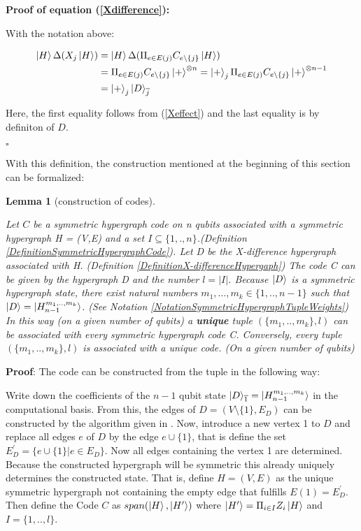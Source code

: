 \documentclass[12pt]{iopart}
\newtheorem{lemma}{Lemma}
\begin{document}
\textbf{Proof of equation (\ref{Xdifference}):}

With the notation above:

\begin{eqnarray}
\ket{H} \Delta (X_j\ket{H}) &= \ket{H} \Delta (\Pi_{e \in E(j)} C_{e \setminus \{j\}} \ket{H}) \nonumber \\ &=\Pi_{e \in E(j)} C_{e \setminus \{j\}} \ket{+}^{\otimes n} = \ket{+}_j \Pi_{e \in E(j)} C_{e\setminus \{j\}} \ket{+}^{\otimes n-1} \nonumber \\ &= \ket{+}_j\ket{D}_{\overline{j}}
\end{eqnarray}

Here, the first equality follows from (\ref{Xeffect}) and the last equality is by definiton of $D$.

\begin{flushright}
$\square$
\end{flushright}

With this definition, the construction mentioned at the beginning of this section can be formalized:

\begin{lemma}[construction of codes]
\label{tupleCorrespondence}

Let $C$ be a symmetric hypergraph code on n qubits associated with a symmetric hypergraph H = (V,E) and a set $I \subseteq \{1,.,n\}$.(Definition \ref{DefinitionSymmetricHypergraphCode}).
Let D be the X-difference hypergraph associated with H. (Definition \ref{DefinitionX-differenceHypergaph})
The code C can be given by the hypergraph D and the number $l = |I|$.
Because $\ket{D}$ is a symmetric hypergraph state, there exist natural numbers
$m_1,...,m_k \in \{1,..,n-1\}$ such that $\ket{D} =\ket{H^{m_1,..,m_k}_{n-1}}$. (See Notation \ref{NotationSymmetricHypergraphTupleWeights})
In this way (on a given number of qubits) a \textbf{unique} tuple $(\{m_1,..,m_k\},l)$ can be associated with every symmetric hypergraph code C. 
Conversely, every tuple $(\{m_1,..,m_k\},l)$ is associated with a unique code. (On a given number of qubits)
\end{lemma}
\textbf{Proof}:
The code can be constructed from the tuple in the following way:

Write down the coefficients of the $n-1$ qubit state $\ket{D}_{\overline{1}} = \ket{H^{m_1,..,m_k}_{n-1}}$ in the computational basis. From this, the edges of $D = (V \setminus \{1\}, E_D)$ can be constructed by the algorithm given in \cite{BP1}. Now, introduce a new vertex 1 to $D$ and replace all edges $e$ of $D$ by the edge $e \cup \{1\}$, that is define the set $E_D^{\prime} = \{e \cup \{1\}| e \in E_D\}$. Now all edges containing the vertex 1 are determined. Because the constructed hypergraph will be symmetric this already uniquely determines the constructed state. That is, define $H = (V,E)$ as the unique symmetric hypergraph not containing the empty edge that fulfills $E(1) = E_D^{\prime}$. Then define the Code $C$ as $span(\ket{H},\ket{H^\prime})$ where $\ket{H^\prime} = \Pi_{i \in I}Z_i\ket{H}$ and $I = \{1,..,l\}$. 
\end{document}
